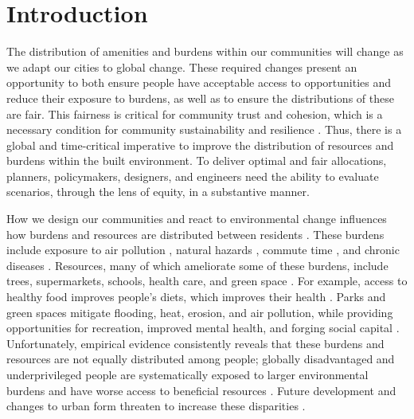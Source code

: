 \documentclass[final,3p,times,onecolumn,sort&compress]{elsarticle}
\begin{document}
\linenumbers

\section{Introduction}
The distribution of amenities and burdens within our communities will change as we adapt our cities to global change.
These required changes present an opportunity to both ensure people have acceptable access to opportunities and reduce their exposure to burdens, as well as to ensure the distributions of these are fair.
This fairness is critical for community trust and cohesion, which is a necessary condition for community sustainability and resilience \citep{Dempsey2011-og, Cutter2008-NJ, Logan2020-vj}.
Thus, there is a global and time-critical imperative to improve the distribution of resources and burdens within the built environment.
To deliver optimal and fair allocations, planners, policymakers, designers, and engineers need the ability to evaluate scenarios, through the lens of equity, in a substantive manner.

How we design our communities and react to environmental change influences how burdens and resources are distributed between residents \citep{Marino2012-lq,Wilson2008-yk, Calvin2017-ja}.
These burdens include exposure to air pollution \citep{Maguire2011-fi, Sheriff2020-ge}, natural hazards \citep{Burby2000-qe, Saunders2007-of}, commute time \citep{Frumkin2004-yi}, and chronic diseases \citep{Lopez2006-jb}.
Resources, many of which ameliorate some of these burdens, include trees, supermarkets, schools, health care, and green space \citep{Schwarz2015-fs, Logan2019-fr, Nesbitt2019-sk, Pacione1989-ui, Apparicio2007-di, Whitehead2019-tf}.
For example, access to healthy food improves people's diets, which improves their health \citep{Garcia2020-xt, Kolak2018-az}.
Parks and green spaces mitigate flooding, heat, erosion, and air pollution, while providing opportunities for recreation, improved mental health, and forging social capital \citep{Dempsey2011-og, Astell-Burt2013-og,Kazmierczak2011-ot, Norton2015-vv}.
Unfortunately, empirical evidence consistently reveals that these burdens and resources are not equally distributed among people;
globally disadvantaged and underprivileged people are systematically exposed to larger environmental burdens and have worse access to beneficial resources \citep{Fussel2010-te, Bulkeley2014-so}.
Future development and changes to urban form threaten to increase these disparities \citep{Gusdorf2008-bm, Calvin2017-ja}.
\end{document}
